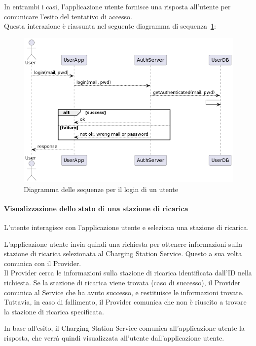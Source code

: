 In entrambi i casi, l'applicazione utente fornisce una risposta all'utente per comunicare
l'esito del tentativo di accesso.\\

Questa interazione è riassunta nel seguente diagramma di sequenza \ref{fig:login}:
\begin{figure}[htbp]
    \centering
    \includegraphics[width=\textwidth]{images/login.png}
    \caption{Diagramma delle sequenze per il login di un utente}
    \label{fig:login}
\end{figure}

\paragraph{Visualizzazione dello stato di una stazione di ricarica}
L'utente interagisce con l'applicazione utente e seleziona una stazione di ricarica.

L'applicazione utente invia quindi una richiesta per ottenere informazioni sulla stazione di
ricarica selezionata al Charging Station Service. Questo a sua volta comunica con il Provider.\\

Il Provider cerca le informazioni sulla stazione di ricarica identificata dall'ID nella richiesta.
Se la stazione di ricarica viene trovata (caso di successo), il Provider comunica al Service che
ha avuto successo, e restituisce le informazioni trovate.\\

Tuttavia, in caso di fallimento, il Provider comunica che non è riuscito a trovare la stazione di
ricarica specificata.

In base all'esito, il Charging Station Service comunica all'applicazione utente la risposta,
che verrà quindi visualizzata all'utente dall'applicazione utente.


